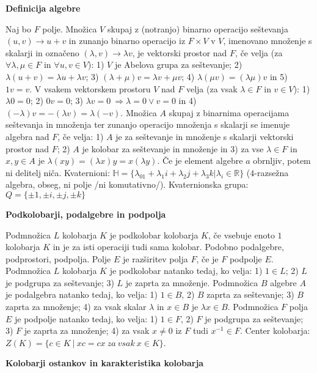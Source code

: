 \documentclass[10pt]{extarticle}
\begin{document}
    \textbf{Definicija algebre}

        
             Naj bo $F$ polje. Množica $V$ skupaj z (notranjo) binarno operacijo seštevanja $(u,v)\to u+v$ in zunanjo binarno operacijo iz $F\times V$ v $V$, imenovano množenje s skalarji in označeno $(\lambda, v)\to \lambda v$, je vektorski prostor nad $F$, če velja (za $\forall \lambda,\mu \in F$ in $\forall u,v\in V$): 1) $V$ je Abelova grupa za seštevanje; 2) $\lambda(u+v)=\lambda u+\lambda v$; 3) $(\lambda+\mu)v=\lambda v+\mu v$; 4) $\lambda(\mu v)=(\lambda\mu)v$ in 5) $1v=v$.
             V vsakem vektorskem prostoru $V$ nad $F$ velja (za vsak $\lambda \in F$ in $v\in V$): 1) $\lambda 0=0$; 2) $0v=0$; 3) $\lambda v=0~\Rightarrow\lambda=0\vee v=0$ in 4) $(-\lambda)v=-(\lambda v)=\lambda(-v)$.
             Množica $A$ skupaj z binarnima operacijama seštevanja in množenja ter zunanjo operacijo množenja s skalarji se imenuje algebra nad $F$, če velja: 1) $A$ je za seštevanje in množenje s skalarji vektorski prostor nad $F$; 2) $A$ je kolobar za seštevanje in množenje in 3) za vse $\lambda\in F$ in $x,y\in A$ je $\lambda(xy)=(\lambda x)y=x(\lambda y)$.
             Če je element algebre $a$ obrnljiv, potem ni delitelj niča.
             Kvaternioni: $\mathbb{H}=\{\lambda_01+\lambda_1i+\lambda_2j+\lambda_3k | \lambda_i\in\mathbb{R}\}$ ($4$-razsežna algebra, obseg, ni polje /ni komutativno/).
             Kvaternionska grupa: $Q=\{\pm 1,\pm i, \pm j, \pm k\}$


    \textbf{Podkolobarji, podalgebre in podpolja}

        
             Podmnožica $L$ kolobarja $K$ je podkolobar kolobarja $K$, če vsebuje enoto $1$ kolobarja $K$ in je za isti operaciji tudi sama kolobar.
            Podobno podalgebre, podprostori, podpolja.   
            Polje $E$ je razširitev polja $F$, če je $F$ podpolje $E$.
             Podmnožica $L$ kolobarja $K$ je podkolobar natanko tedaj, ko velja: 1) $1\in L$; 2) $L$ je podgrupa za seštevanje; 3) $L$ je zaprta za množenje.
             Podmnožica $B$ algebre $A$ je podalgebra natanko tedaj, ko velja: 1) $1\in B$, 2) $B$ zaprta za seštevanje; 3) $B$ zaprta za množenje; 4) za vsak skalar $\lambda$ in $x\in B$ je $\lambda x\in B$.
             Podmnožica $F$ polja $E$ je podpolje natanko tedaj, ko velja: 1) $1\in F$, 2) $F$ je podgrupa za seštevanje; 3) $F$ je zaprta za množenje; 4) za vsak $x\neq 0$ iz $F$ tudi $x^{-1}\in F$.
             Center kolobarja: $Z(K)=\{c\in K~|~xc=cx~za~vsak~x\in K\}$.


    \textbf{Kolobarji ostankov in karakteristika kolobarja}
\end{document}
